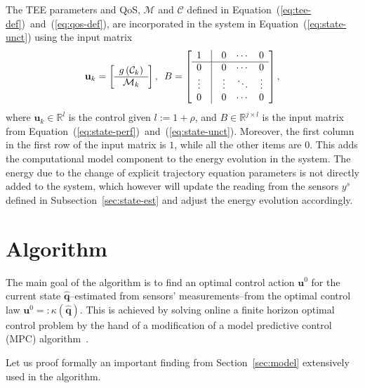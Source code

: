 \documentclass[letterpaper,10pt,conference]{ieeeconf}
\begin{document}
The TEE parameters and QoS, $\mathcal{M}$ and $\mathcal{C}$ defined in Equation~(\ref{eq:tee-def})~and~(\ref{eq:qos-def}), are incorporated in the system in Equation~(\ref{eq:state-unct}) using the input matrix
\begin{equation}
  \mathbf{u}_k=\left[\begin{array}{c}
    g\left(\mathcal{C}_k\right) \\\hline \mathcal{M}_k
  \end{array}\right],\,\,\,
  B=\left[\begin{array}{ccccccc}
    1 & \vline & 0 & \cdots & 0\\\hline
    0 & \vline & 0 & \cdots & 0\\
    \vdots & \vline & \vdots & \ddots & \vdots\\
    0 & \vline & 0 & \cdots & 0
  \end{array}\right],
\end{equation}
where $\mathbf{u}_k\in\mathbb{R}^l$ is the control given $l:=1+\rho$, and $B\in\mathbb{R}^{j\times l}$ is the input matrix from Equation~(\ref{eq:state-perf})~and~(\ref{eq:state-unct}). Moreover, the first column in the first row of the input matrix is $1$, while all the other items are $0$. This adds the computational model component to the energy evolution in the system. The energy due to the change of explicit trajectory equation parameters is not directly added to the system, which however will update the reading from the sensors $y^s$ defined in Subsection~\ref{sec:state-est} and adjust the energy evolution accordingly.

\section{Algorithm}

The main goal of the algorithm is to find an optimal control action $\mathbf{u}^0$ for the current state $\hat{\mathbf{q}}$--estimated from sensors' measurements--from the optimal control law $\mathbf{u}^0=:\kappa(\hat{\mathbf{q}})$. This is achieved by solving online a finite horizon optimal control problem by the hand of a modification of a model predictive control (MPC) algorithm~\cite{rawlings2017model}.

Let us proof formally an important finding from Section~\ref{sec:model} extensively used in the algorithm.

\end{document}
